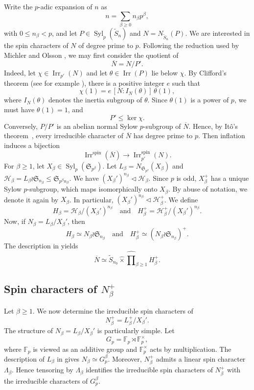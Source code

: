 \documentclass[reqno]{amsart}
\DeclareMathOperator{\Irr}{Irr}
\DeclareMathOperator{\Syl}{Syl}
\newcommand{\tSym}{\widetilde{S}}
\newcommand{\sym}{\mathfrak{S}}
\theoremstyle{definition}
\begin{document}
Write the $p$-adic expansion of $n$ as
\begin{equation}
\label{eq:expansionadicn}
n=\sum_{\beta\geq0}n_\beta p^\beta,
\end{equation}
with $0\leq n_\beta<p$, and let $P\in\Syl_p(\tSym_n)$ and $
N=N_{\tSym_n}(P)$. We are interested in the spin characters of $ N$ of
degree prime to $p$. Following the reduction used by Michler and Olsson
\cite{MichlerOlsson}, we may first consider the quotient of
$$\overline N=N/P'.$$ 
Indeed, let $\chi\in\Irr_{p'}(N)$ and let $\theta\in\Irr(P)$ lie below
$\chi$. By Clifford's theorem (see for example \cite[Theorem
(6.2)]{isaacs}), there is a positive integer $e$ such that
\[
\chi(1)
=
e\,[N:I_{N}(\theta)]\,\theta(1),
\]
where $I_{N}(\theta)$ denotes the inertia subgroup of $\theta$. Since
$\theta(1)$ is a power of $p$, we must have $\theta(1)=1$, and 
\[
P'\leq\ker\chi.
\]
Conversely, $P/P'$ is an abelian normal Sylow $p$-subgroup of $\overline
N$. Hence, by It\^o's theorem~\cite[Theorem (6.15)]{isaacs}, every
irreducible character of $\overline N$ has degree prime to $p$. Then
inflation induces a bijection
\[
\Irr^{\mathrm{spin}}(\overline N)
\longrightarrow
\Irr_{p'}^{\mathrm{spin}}(N).
\]
For $\beta\geq1$, let $X_\beta\in\Syl_p(\sym_{p^\beta})$. Let
$L_\beta=N_{\sym_{p^\beta}}(X_\beta)$ and $\mathcal H_\beta= L_\beta\wr
\sym_{n_\beta}\leq \sym_{p^\beta n_\beta}$. We have $(X_\beta')^{n_\beta}
\triangleleft \mathcal H_\beta$.
Since $p$ is odd, $X_\beta^+$ has a unique Sylow $p$-subgroup, which maps
isomorphically onto $X_\beta$. By abuse of notation, we denote it again by
$X_\beta$. In particular, $(X_\beta')^{n_\beta} \triangleleft \mathcal
H_\beta^+$. We define
\[
H_\beta=\mathcal H_\beta/(X_\beta')^{n_\beta}
\quad\text{and}\quad
H_\beta^+=\mathcal H_\beta^+/(X_\beta')^{n_\beta}.
\]
Now, if $N_\beta=L_\beta/X_\beta'$, then 
$$H_\beta\simeq N_\beta\wr \sym_{n_\beta}\quad \text{and}\quad
H_\beta^+\simeq (N_\beta\wr
\sym_{n_\beta})^+.$$
The description in \cite[\S3, pp.~87--92]{MichlerOlsson} yields
\begin{equation}
\label{eq:reduced-local-decomposition}
\overline N
\simeq
\tSym_{n_0}
\widehat\times
\widehat{\prod}_{\beta\geq1} H_\beta^+.
\end{equation}

\subsection{Spin characters of \(N_\beta^+\)}

Let $\beta\geq 1$. We now determine the irreducible spin characters of
\[
N_\beta^+=L_\beta^+/X_\beta'.
\]
The structure of $N_\beta=L_\beta/X_\beta'$ is particularly simple. Let
\[
G_p=\mathbb F_p\rtimes\mathbb F_p^\times,
\]
where $\mathbb F_p$ is viewed as an additive group and $\mathbb
F_p^\times$ acts by multiplication.
The description of $L_\beta$ in \cite{MichlerOlsson} gives $ N_\beta\simeq
G_p^\beta. $ Moreover, $N_\beta^+$ admits a linear spin character
$\Lambda_\beta$. Hence tensoring by $\Lambda_\beta$ identifies the
irreducible spin characters of $N_\beta^+$ with the irreducible characters
of $G_p^\beta$. 
\end{document}
